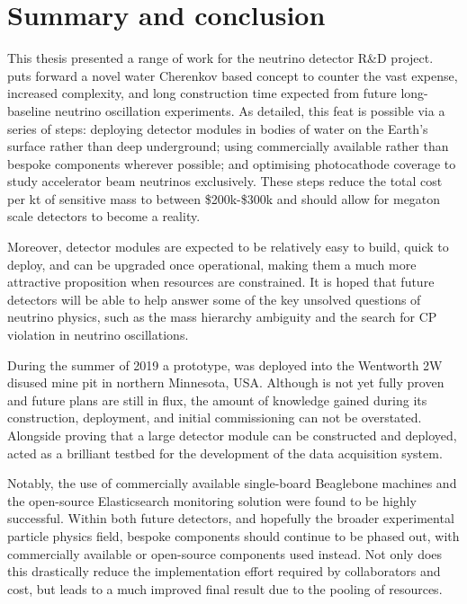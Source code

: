 \chapter{Summary and conclusion} %
\label{chap:conclusion} %

This thesis presented a range of work for the \chips neutrino detector R\&D project. \chips puts
forward a novel water Cherenkov based concept to counter the vast expense, increased complexity,
and long construction time expected from future long-baseline neutrino oscillation experiments. As
detailed, this feat is possible via a series of steps: deploying detector modules in bodies of
water on the Earth's surface rather than deep underground; using commercially available rather
than bespoke components wherever possible; and optimising photocathode coverage to study
accelerator beam neutrinos exclusively. These steps reduce the total cost per kt of sensitive mass
to between \$200k-\$300k and should allow for megaton scale detectors to become a reality.

Moreover, \chips detector modules are expected to be relatively easy to build, quick to deploy,
and can be upgraded once operational, making them a much more attractive proposition when
resources are constrained. It is hoped that future \chips detectors will be able to help answer
some of the key unsolved questions of neutrino physics, such as the mass hierarchy ambiguity and
the search for CP violation in neutrino oscillations.

During the summer of 2019 a \chips prototype, \chipsfive was deployed into the Wentworth 2W
disused mine pit in northern Minnesota, USA. Although \chipsfive is not yet fully proven and
future plans are still in flux, the amount of knowledge gained during its construction,
deployment, and initial commissioning can not be overstated. Alongside proving that a large \chips
detector module can be constructed and deployed, \chipsfive acted as a brilliant testbed for the
development of the \chips data acquisition system. 

Notably, the use of commercially available single-board Beaglebone machines and the open-source
Elasticsearch monitoring solution were found to be highly successful. Within both future \chips
detectors, and hopefully the broader experimental particle physics field, bespoke components
should continue to be phased out, with commercially available or open-source components used
instead. Not only does this drastically reduce the implementation effort required by collaborators
and cost, but leads to a much improved final result due to the pooling of resources. 

